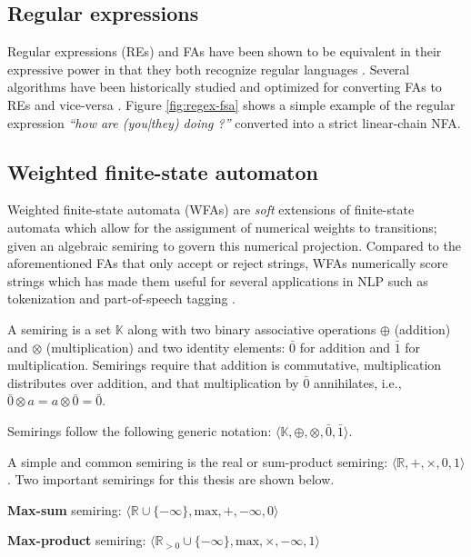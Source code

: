 \subsection{Regular expressions}

Regular expressions (REs) and FAs have been shown to be equivalent in their
expressive power in that they both recognize regular languages
\citep{sipser1996introduction}. Several algorithms have been historically
studied and optimized for converting FAs to REs and vice-versa
\citep{mcnaughton1960regular,thompson1968programming}. Figure
\ref{fig:regex-fsa} shows a simple example of the regular expression
\textit{``how are (you|they) doing ?''} converted into a strict linear-chain
NFA.

\subsection{Weighted finite-state automaton}

Weighted finite-state automata (WFAs) are \textit{soft} extensions of
finite-state automata which allow for the assignment of numerical weights to
transitions; given an algebraic semiring to govern this numerical projection.
Compared to the aforementioned FAs that only accept or reject strings, WFAs
numerically score strings which has made them useful for several applications in
NLP such as tokenization and part-of-speech tagging \citep{maletti2017survey}.

\begin{definition}
  A semiring is a set $\mathbb{K}$ along with two binary associative operations
  $\oplus$ (addition) and $\otimes$ (multiplication) and two identity elements:
  $\bar{0}$ for addition and $\bar{1}$ for multiplication. Semirings require
  that addition is commutative, multiplication distributes over addition, and
  that multiplication by $\bar{0}$ annihilates, i.e., $\bar{0} \otimes a = a
  \otimes \bar{0} = \bar{0}$.

\begin{remark}
  Semirings follow the following generic notation: $\langle \mathbb{K}, \oplus,
  \otimes, \bar{0}, \bar{1} \rangle$.
\end{remark}

\begin{remark}
  A simple and common semiring is the real or sum-product semiring: $\langle
  \mathbb{R}, +, \times, 0, 1 \rangle$. Two important semirings for this thesis
  are shown below.
\end{remark}

\begin{remark}
  \textbf{Max-sum} semiring: $\langle \mathbb{R} \cup \{-\infty\}, \text{max},
  +, -\infty, 0 \rangle$
\end{remark}

\begin{remark}
  \textbf{Max-product} semiring: $\langle \mathbb{R}_{>0} \cup \{-\infty\},
  \text{max}, \times, -\infty, 1 \rangle$
\end{remark}

\end{definition}

